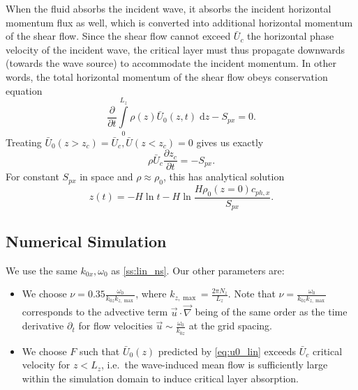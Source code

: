 \documentclass[twocolumn,
        nofootinbib, %
        usenames, %
        aps,
        prd,
        dvipsnames %
    ]{revtex4-1}%
\newcommand*{\pd}[2]{\frac{\partial#1}{\partial#2}}
\begin{document}
When the fluid absorbs the incident wave, it absorbs the incident horizontal
momentum flux as well, which is converted into additional horizontal momentum of
the shear flow. Since the shear flow cannot exceed $\bar{U}_c$ the horizontal
phase velocity of the incident wave, the critical layer must thus propagate
downwards (towards the wave source) to accommodate the incident momentum. In
other words, the total horizontal momentum of the shear flow obeys conservation
equation
\begin{equation}
    \pd{}{t}\int\limits_0^{L_z} \rho(z) \bar{U}_0(z, t)\;\mathrm{d}z
        - S_{px} = 0.
\end{equation}
Treating $\bar{U}_0(z > z_c) = \bar{U}_c, \bar{U}(z < z_c) = 0$ gives us exactly
\begin{equation}
    \rho \bar{U}_c\pd{z_c}{t} = -S_{px}.\label{eq:zc_anal}
\end{equation}
For constant $S_{px}$ in space and $\rho \approx \rho_0$, this has analytical
solution
\begin{equation}
    z(t) = -H\ln t - H\ln \frac{H\rho_0(z = 0)c_{ph, x}}{S_{px}}.
\end{equation}

\subsection{Numerical Simulation}

We use the same $k_{0x}, \omega_0$ as \autoref{ss:lin_ns}. Our other parameters
are:
\begin{itemize}
    \item We choose $\nu = 0.35 \frac{\omega_0}{k_{0z}k_{z, \max}}$, where
        $k_{z, \max} = \frac{2\pi N_z}{L_z}$. Note that $\nu =
        \frac{\omega_0}{k_{0z} k_{z, \max}}$ corresponds to the advective term
        $\vec{u} \cdot \vec{\nabla}$ being of the same order as the time
        derivative $\partial_t$ for flow velocities $\vec{u} \sim
        \frac{\omega_0}{k_{0z}}$ at the grid spacing.

    \item We choose $F$ such that $\bar{U}_0(z)$ predicted by
        \autoref{eq:u0_lin} exceeds $\bar{U}_c$ critical velocity for $z <
        L_z$, i.e.\ the wave-induced mean flow is sufficiently large within the
        simulation domain to induce critical layer absorption.
\end{itemize}
\end{document}
